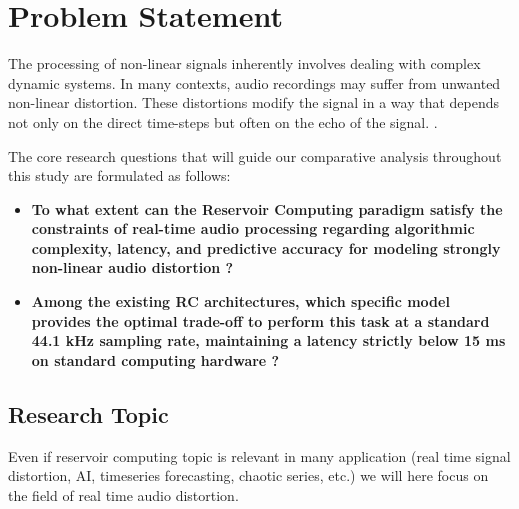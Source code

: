 \section{Problem Statement}

The processing of non-linear signals inherently involves dealing with complex dynamic systems. In many contexts, audio recordings may suffer from unwanted non-linear distortion. These distortions modify the signal in a way that depends not only on the direct time-steps but often on the echo of the signal. \cite{Keuninckx2017RealTime}.

\vspace{0.5cm}

The core research questions that will guide our comparative analysis throughout this study are formulated as follows:

\begin{itemize}
    \item \textbf{To what extent can the Reservoir Computing paradigm satisfy the constraints of real-time audio processing regarding algorithmic complexity, latency, and predictive accuracy for modeling strongly non-linear audio distortion ?}
    \item \textbf{Among the existing RC architectures, which specific model provides the optimal trade-off to perform this task at a standard 44.1 kHz sampling rate, maintaining a latency strictly below 15 ms on standard computing hardware ?}
\end{itemize}


\subsection{Research Topic}

Even if reservoir computing topic is relevant in many application (real time signal distortion, AI, timeseries forecasting, chaotic series, etc.) we will here focus on the field of real time audio distortion.


